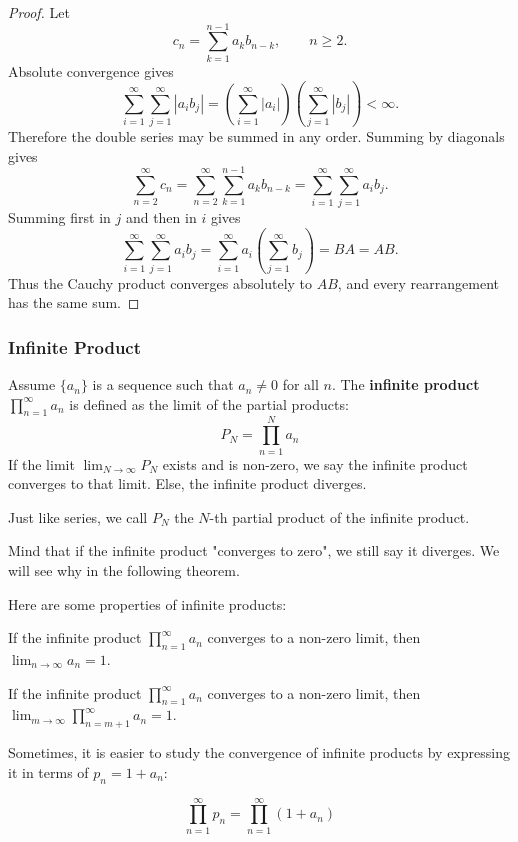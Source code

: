 \begin{proof}
Let
\[
    c_n=\sum_{k=1}^{n-1}a_kb_{n-k},\qquad n\ge2.
\]
Absolute convergence gives
\[
\sum_{i=1}^{\infty}\sum_{j=1}^{\infty}|a_i b_j|
=\left(\sum_{i=1}^{\infty}|a_i|\right)
 \left(\sum_{j=1}^{\infty}|b_j|\right)<\infty.
\]
Therefore the double series may be summed in any order. Summing by diagonals gives
\[
\sum_{n=2}^{\infty}c_n
=\sum_{n=2}^{\infty}\sum_{k=1}^{n-1}a_kb_{n-k}
=\sum_{i=1}^{\infty}\sum_{j=1}^{\infty}a_i b_j.
\]
Summing first in $j$ and then in $i$ gives
\[
\sum_{i=1}^{\infty}\sum_{j=1}^{\infty}a_i b_j
=\sum_{i=1}^{\infty}a_i\left(\sum_{j=1}^{\infty}b_j\right)
=BA=AB.
\]
Thus the Cauchy product converges absolutely to $AB$, and every rearrangement has the same sum.
\end{proof}

\subsubsection{Infinite Product}
\begin{definition}
    Assume $\{a_n\}$ is a sequence such that $a_n \neq 0$ for all $n$. The \textbf{infinite product} $\prod_{n=1}^{\infty} a_n$ is defined as the limit of the partial products:
    \[ P_N = \prod_{n=1}^{N} a_n \]
    If the limit $\lim_{N \to \infty} P_N$ exists and is non-zero, we say the infinite product converges to that limit.
    Else, the infinite product diverges.
\end{definition}

Just like series, we call $P_N$ the $N$-th partial product of the infinite product.

Mind that if the infinite product "converges to zero", we still say it diverges. We will see why in the following theorem.

Here are some properties of infinite products:

\begin{theorem}
    If the infinite product $\prod_{n=1}^{\infty} a_n$ converges to a non-zero limit, then $\lim_{n \to \infty} a_n = 1$.
    
    If the infinite product $\prod_{n=1}^{\infty} a_n$ converges to a non-zero limit, then $\lim_{m \to \infty} \prod_{n=m+1}^{\infty} a_n = 1$.
\end{theorem}

Sometimes, it is easier to study the convergence of infinite products by expressing it in terms of $p_n = 1 + a_n$:

\[
\prod_{n=1}^{\infty} p_n = \prod_{n=1}^{\infty} (1 + a_n)
\]

